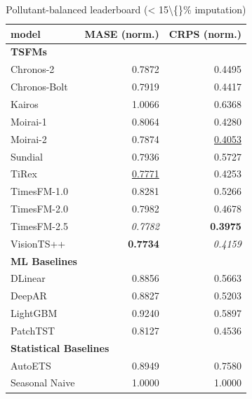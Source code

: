 \begin{table}[H]
\caption{Pollutant-balanced leaderboard (\textless{} 15\textbackslash\{\}\% imputation)}
\centering
\begin{small}
\begin{tabular}{lrr}
\toprule
model & MASE (norm.) & CRPS (norm.) \\
\midrule
\multicolumn{3}{l}{\textbf{TSFMs}} \\
Chronos-2 & 0.7872 & 0.4495 \\
Chronos-Bolt & 0.7919 & 0.4417 \\
Kairos & 1.0066 & 0.6368 \\
Moirai-1 & 0.8064 & 0.4280 \\
Moirai-2 & 0.7874 & \underline{0.4053} \\
Sundial & 0.7936 & 0.5727 \\
TiRex & \underline{0.7771} & 0.4253 \\
TimesFM-1.0 & 0.8281 & 0.5266 \\
TimesFM-2.0 & 0.7982 & 0.4678 \\
TimesFM-2.5 & \textit{0.7782} & \textbf{0.3975} \\
VisionTS++ & \textbf{0.7734} & \textit{0.4159} \\
\midrule
\multicolumn{3}{l}{\textbf{ML Baselines}} \\
DLinear & 0.8856 & 0.5663 \\
DeepAR & 0.8827 & 0.5203 \\
LightGBM & 0.9240 & 0.5897 \\
PatchTST & 0.8127 & 0.4536 \\
\midrule
\multicolumn{3}{l}{\textbf{Statistical Baselines}} \\
AutoETS & 0.8949 & 0.7580 \\
Seasonal Naive & 1.0000 & 1.0000 \\
\bottomrule
\end{tabular}
\end{small}
\end{table}